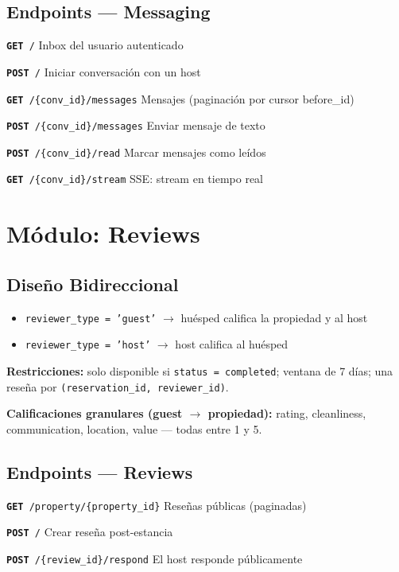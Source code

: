 \documentclass[12pt,a4paper]{report}
\newcommand{\apiendpoint}[3]{%
  \noindent\texttt{\textcolor{beelprimary}{\textbf{#1}}\ \textcolor{beeltier}{#2}}%
  \hfill\textcolor{beelgray}{\small #3}\par\smallskip
}
\begin{document}
\subsection{Endpoints --- Messaging}

\begin{tcolorbox}[beelinfo, title={/api/v1/messaging}]
\apiendpoint{GET}{/}{Inbox del usuario autenticado}
\apiendpoint{POST}{/}{Iniciar conversaci\'on con un host}
\apiendpoint{GET}{/\{conv\_id\}/messages}{Mensajes (paginaci\'on por cursor before\_id)}
\apiendpoint{POST}{/\{conv\_id\}/messages}{Enviar mensaje de texto}
\apiendpoint{POST}{/\{conv\_id\}/read}{Marcar mensajes como le\'idos}
\apiendpoint{GET}{/\{conv\_id\}/stream}{SSE: stream en tiempo real}
\end{tcolorbox}

\section{M\'odulo: Reviews}

\subsection{Dise\~no Bidireccional}

\begin{itemize}[leftmargin=*]
  \item \texttt{reviewer\_type = 'guest'} $\rightarrow$ hu\'esped califica la propiedad y al host
  \item \texttt{reviewer\_type = 'host'} $\rightarrow$ host califica al hu\'esped
\end{itemize}

\textbf{Restricciones:} solo disponible si \texttt{status = completed}; ventana de 7 d\'ias;
una rese\~na por \texttt{(reservation\_id, reviewer\_id)}.

\textbf{Calificaciones granulares (guest $\rightarrow$ propiedad):}
rating, cleanliness, communication, location, value --- todas entre 1 y 5.

\subsection{Endpoints --- Reviews}

\begin{tcolorbox}[beelinfo, title={/api/v1/reviews}]
\apiendpoint{GET}{/property/\{property\_id\}}{Rese\~nas p\'ublicas (paginadas)}
\apiendpoint{POST}{/}{Crear rese\~na post-estancia}
\apiendpoint{POST}{/\{review\_id\}/respond}{El host responde p\'ublicamente}
\end{tcolorbox}
\end{document}
